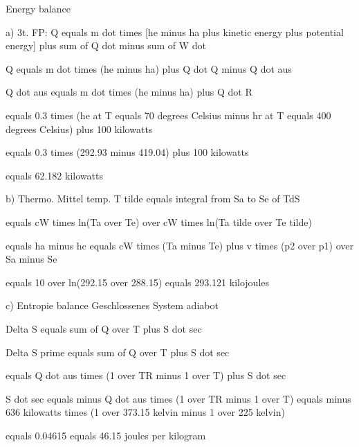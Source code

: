 Energy balance

a) 3t. FP:
Q equals m dot times [he minus ha plus kinetic energy plus potential energy] plus sum of Q dot minus sum of W dot

Q equals m dot times (he minus ha) plus Q dot Q minus Q dot aus

Q dot aus equals m dot times (he minus ha) plus Q dot R

equals 0.3 times (he at T equals 70 degrees Celsius minus hr at T equals 400 degrees Celsius) plus 100 kilowatts

equals 0.3 times (292.93 minus 419.04) plus 100 kilowatts

equals 62.182 kilowatts

b) Thermo. Mittel temp.
T tilde equals integral from Sa to Se of TdS

equals cW times ln(Ta over Te) over cW times ln(Ta tilde over Te tilde)

equals ha minus hc equals cW times (Ta minus Te) plus v times (p2 over p1) over Sa minus Se

equals 10 over ln(292.15 over 288.15) equals 293.121 kilojoules

c) Entropie balance
Geschlossenes System adiabot

Delta S equals sum of Q over T plus S dot sec

Delta S prime equals sum of Q over T plus S dot sec

equals Q dot aus times (1 over TR minus 1 over T) plus S dot sec

S dot sec equals minus Q dot aus times (1 over TR minus 1 over T) equals minus 636 kilowatts times (1 over 373.15 kelvin minus 1 over 225 kelvin)

equals 0.04615 equals 46.15 joules per kilogram